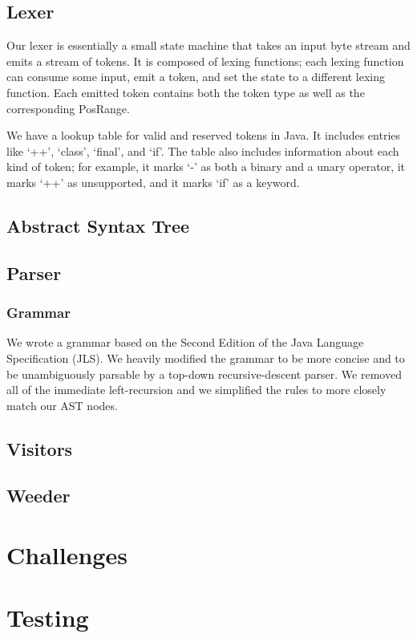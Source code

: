 \documentclass[12pt, titlepage]{article}
\begin{document}
\subsection{Lexer}
Our lexer is essentially a small state machine that takes an input byte stream
and emits a stream of tokens. It is composed of lexing functions; each lexing
function can consume some input, emit a token, and set the state to a different
lexing function. Each emitted token contains both the token type as well as the
corresponding PosRange.

We have a lookup table for valid and reserved tokens in Java. It includes
entries like `++', `class', `final', and `if'. The table also includes
information about each kind of token; for example, it marks `-' as both a
binary and a unary operator, it marks `++' as unsupported, and it marks `if' as
a keyword.

\subsection{Abstract Syntax Tree}

\subsection{Parser}


\subsubsection{Grammar}
We wrote a grammar based on the Second Edition of the Java Language
Specification (JLS). We heavily modified the grammar to be more concise and to
be unambiguously parsable by a top-down recursive-descent parser. We removed
all of the immediate left-recursion and we simplified the rules to more closely
match our AST nodes.

\subsection{Visitors}

\subsection{Weeder}

\section{Challenges}

\section{Testing}
\end{document}
